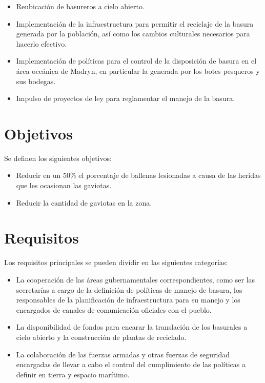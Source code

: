 \documentclass[a4paper,11pt]{article}
\begin{document}
\begin{itemize}

  \item Reubicación de basureros a cielo abierto.

  \item Implementación de la infraestructura para permitir el reciclaje de la
    basura generada por la población, así como los cambios culturales
    necesarios para hacerlo efectivo.

  \item Implementación de políticas para el control de la disposición de basura
    en el área oceánica de Madryn, en particular la generada por los botes
    pesqueros y sus bodegas.

  \item Impulso de proyectos de ley para reglamentar el manejo de la basura.

\end{itemize}

\section{Objetivos}

Se definen los siguientes objetivos:

\begin{itemize}

  \item Reducir en un 50\% el porcentaje de ballenas lesionadas a causa de las
    heridas que les ocasionan las gaviotas.

  \item Reducir la cantidad de gaviotas en la zona.

\end{itemize}

\section{Requisitos}

Los requisitos principales se pueden dividir en las siguientes categorías:

\begin{itemize}

  \item La cooperación de las áreas gubernamentales correspondientes, como ser
    las secretarías a cargo de la definición de políticas de manejo de basura,
    los responsables de la planificación de infraestructura para su manejo y
    los encargados de canales de comunicación oficiales con el pueblo.

  \item La disponibilidad de fondos para encarar la translación de los
    basurales a cielo abierto y la construcción de plantas de reciclado.

  \item La colaboración de las fuerzas armadas y otras fuerzas de seguridad
    encargadas de llevar a cabo el control del cumplimiento de las políticas a
    definir en tierra y espacio marítimo.

\end{itemize}
\end{document}

